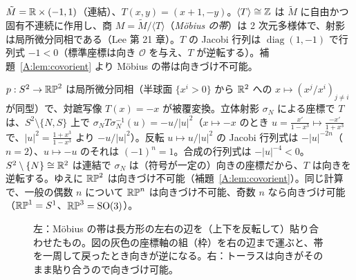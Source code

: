 \begin{ex}[Möbius の帯]\label{A:ex:mobius}
$\tilde M=\mathbb R\times(-1,1)$（連結）、$T(x,y)=(x+1,-y)$。$\langle T\rangle\cong\mathbb Z$ は $\tilde M$ に自由かつ固有不連続に作用し、商 $M=\tilde M/\langle T\rangle$（\emph{Möbius の帯}）は 2 次元多様体で、射影は局所微分同相である\tC（Lee 第 21 章）。$T$ の Jacobi 行列は $\operatorname{diag}(1,-1)$ で行列式 $-1<0$（標準座標は向き $\mathcal O$ を与え、$T$ が逆転する）。補題~\ref{A:lem:covorient} より Möbius の帯は向きづけ不可能。
\end{ex}

\begin{ex}[$\RP^2$]\label{A:ex:RP2}
$p:S^2\to\mathbb{RP}^2$ は局所微分同相（半球面 $\{x^i>0\}$ から $\mathbb R^2$ への $x\mapsto(x^j/x^i)_{j\ne i}$ が同型）で、対蹠写像 $T(x)=-x$ が被覆変換。立体射影 $\sigma_N$ による座標で $T$ は、$S^2\setminus\{N,S\}$ 上で $\sigma_N T\sigma_N^{-1}(u)=-u/|u|^2$（$x\mapsto-x$ のとき $u=\frac{x'}{1-x^3}\mapsto\frac{-x'}{1+x^3}$ で、$|u|^2=\frac{1+x^3}{1-x^3}$ より $-u/|u|^2$）。反転 $u\mapsto u/|u|^2$ の Jacobi 行列式は $-|u|^{-2n}$（$n=2$）、$u\mapsto-u$ のそれは $(-1)^n=1$。合成の行列式は $-|u|^{-4}<0$。$S^2\setminus\{N\}\cong\mathbb R^2$ は連結で $\sigma_N$ は（符号が一定の）向きの座標だから、$T$ は向きを逆転する。ゆえに $\RP^2$ は向きづけ不可能（補題~\ref{A:lem:covorient}）。同じ計算で、一般の偶数 $n$ について $\mathbb{RP}^n$ は向きづけ不可能、奇数 $n$ なら向きづけ可能（$\mathbb{RP}^1=S^1$、$\mathbb{RP}^3=\mathrm{SO}(3)$）。
\end{ex}

\begin{figure}[htbp]
\centering
{}
\caption{左：Möbius の帯は長方形の左右の辺を（上下を反転して）貼り合わせたもの。図の灰色の座標軸の組（枠）を右の辺まで運ぶと、帯を一周して戻ったとき向きが逆になる。右：トーラスは向きがそのまま貼り合うので向きづけ可能。}\label{A:fig:mobius}
\end{figure}

